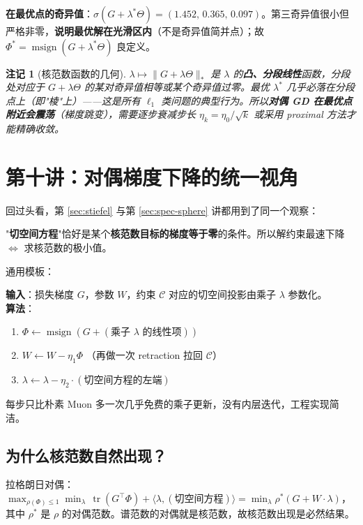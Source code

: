 \documentclass[11pt,a4paper]{article}
\theoremstyle{mythm}
\theoremstyle{mydef}
\newtheorem{remark}[theorem]{注记}
\newcommand{\tr}{\operatorname{tr}}
\newcommand{\msign}{\operatorname{msign}}
\newcommand{\inner}[2]{\langle #1, #2 \rangle}
\newcommand{\nuc}{\ast}
\begin{document}
\textbf{在最优点的奇异值}：$\sigma(G + \lambda^* \Theta) = (1.452,\,0.365,\,0.097)$。第三奇异值很小但严格非零，\textbf{说明最优解在光滑区内}（不是奇异值简并点）；故 $\Phi^* = \msign(G+\lambda^*\Theta)$ 良定义。

\begin{remark}[核范数函数的几何]
$\lambda \mapsto \|G + \lambda\Theta\|_\nuc$ 是 $\lambda$ 的\textbf{凸、分段线性}函数，分段处对应于 $G+\lambda\Theta$ 的某对奇异值相等或某个奇异值过零。最优 $\lambda^*$ 几乎必落在分段点上（即"棱"上）——这是所有 $\ell_1$ 类问题的典型行为。所以\textbf{对偶 GD 在最优点附近会震荡}（梯度跳变），需要逐步衰减步长 $\eta_k = \eta_0/\sqrt{k}$ 或采用 proximal 方法才能精确收敛。
\end{remark}

\section{第十讲：对偶梯度下降的统一视角}\label{sec:dual-unified}

回过头看，第 \ref{sec:stiefel} 与第 \ref{sec:spec-sphere} 讲都用到了同一个观察：
\begin{tcolorbox}[colback=green!3,colframe=green!50!black,title=\textbf{Modular Manifolds 核心观察}]
"\textbf{切空间方程}"恰好是某个\textbf{核范数目标的梯度等于零}的条件。所以解约束最速下降 $\Leftrightarrow$ 求核范数的极小值。
\end{tcolorbox}

通用模板：
\begin{tcolorbox}[colback=gray!5,colframe=gray!50!black]
\textbf{输入}：损失梯度 $G$，参数 $W$，约束 $\mathcal{C}$ 对应的切空间投影由乘子 $\lambda$ 参数化。\\
\textbf{算法}：
\begin{enumerate}[leftmargin=2em]
\item $\Phi \gets \msign(G + (\text{乘子 $\lambda$ 的线性项}))$
\item $W \gets W - \eta_1 \Phi$ \quad（再做一次 retraction 拉回 $\mathcal{C}$）
\item $\lambda \gets \lambda - \eta_2 \cdot (\text{切空间方程的左端})$
\end{enumerate}
\end{tcolorbox}

每步只比朴素 Muon 多一次几乎免费的乘子更新，没有内层迭代，工程实现简洁。

\subsection{为什么核范数自然出现？}
拉格朗日对偶：
$\max_{\rho(\Phi)\le 1}\min_\lambda\, \tr(G^\top\Phi)+\inner{\lambda}{(\text{切空间方程})}=\min_\lambda \rho^\ast(G+W\cdot\lambda)$，
其中 $\rho^\ast$ 是 $\rho$ 的对偶范数。谱范数的对偶就是核范数，故核范数出现是必然结果。
\end{document}
